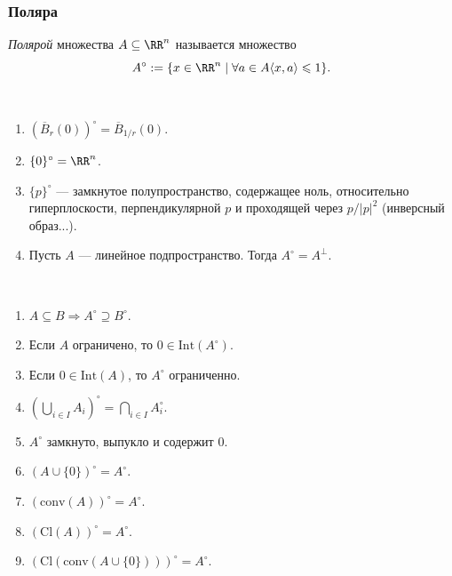 \documentclass[12pt,a4paper]{article}
\newcommand{\Int}{\ensuremath{\mathrm{Int}}\xspace}
\newcommand{\Cl}{\ensuremath{\mathrm{Cl}}\xspace}
\newcommand{\conv}{\ensuremath{\mathrm{conv}}\xspace}
\begin{document}
    \subsubsection{Поляра}

    \begin{definition}
        \emph{Полярой} множества $A \subseteq \RR^n$ называется множество
        \[A^\circ := \{x \in \RR^n \mid \forall a \in A \langle x, a \rangle \leqslant 1\}.\]
    \end{definition}

    \begin{example}\ 
        \begin{enumerate}
            \item $\left(\overline{B}_r(0)\right)^\circ = \overline{B}_{1/r}(0)$.
            \item $\{0\}^\circ = \RR^n$.
            \item $\{p\}^\circ$ --- замкнутое полупространство, содержащее ноль, относительно гиперплоскости, перпендикулярной $p$ и проходящей через $p/|p|^2$ (инверсный образ...).
            \item Пусть $A$ --- линейное подпространство. Тогда $A^\circ = A^\perp$.
        \end{enumerate}
    \end{example}

    \begin{lemma}\ 
        \begin{enumerate}
            \item $A \subseteq B \Longrightarrow A^\circ \supseteq B^\circ$.
            \item Если $A$ ограничено, то $0 \in \Int(A^\circ)$.
            \item Если $0 \in \Int(A)$, то $A^\circ$ ограниченно.
            \item $\left(\bigcup_{i \in I} A_i\right)^\circ = \bigcap_{i \in I} A_i^\circ$.
            \item $A^\circ$ замкнуто, выпукло и содержит $0$.
            \item $(A \cup \{0\})^\circ = A^\circ$.
            \item $(\conv(A))^\circ = A^\circ$.
            \item $(\Cl(A))^\circ = A^\circ$.
            \item $(\Cl(\conv(A \cup \{0\})))^\circ = A^\circ$.
        \end{enumerate}
    \end{lemma}
\end{document}
